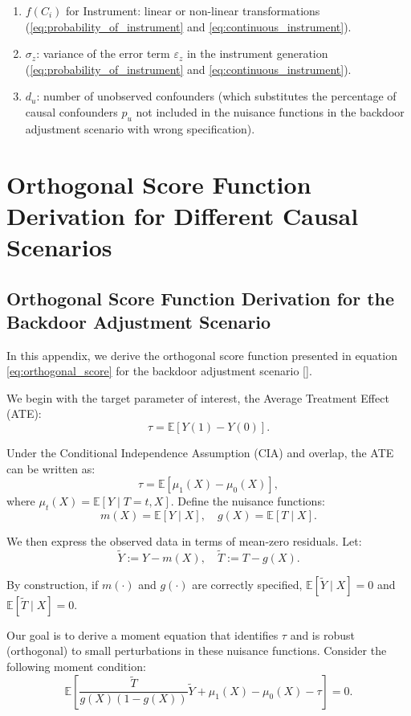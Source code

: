 \documentclass{article}
\numberwithin{equation}{section}
\begin{document}
\begin{enumerate}[label=\roman*.]
    \item $f(C_i)$ for Instrument: linear or non-linear transformations (\ref{eq:probability_of_instrument} and \ref{eq:continuous_instrument}).
    \item $\sigma_z$: variance of the error term $\varepsilon_z$ in the instrument generation (\ref{eq:probability_of_instrument} and \ref{eq:continuous_instrument}).
    \item $d_u$: number of unobserved confounders (which substitutes the percentage of causal confounders $p_u$ not included in the nuisance functions in the backdoor adjustment scenario with wrong specification).
\end{enumerate}

\section{Orthogonal Score Function Derivation for Different Causal Scenarios}

\subsection{Orthogonal Score Function Derivation for the Backdoor Adjustment Scenario}
\label{subsec:appendix_orthogonal_score_function_backdoor_adjustment}

In this appendix, we derive the orthogonal score function presented in equation \eqref{eq:orthogonal_score} for the backdoor adjustment scenario [\cite{ChernozhukovChetverikovDemireretal2018, Pearl2009}].

We begin with the target parameter of interest, the Average Treatment Effect (ATE):
\[
\tau = \mathbb{E}[Y(1) - Y(0)].
\]

Under the Conditional Independence Assumption (CIA) and overlap, the ATE can be written as:
\[
\tau = \mathbb{E}[\mu_1(X) - \mu_0(X)],
\]
where \(\mu_t(X) = \mathbb{E}[Y \mid T=t,X]\). Define the nuisance functions:
\[
m(X) = \mathbb{E}[Y \mid X], \quad g(X) = \mathbb{E}[T \mid X].
\]

We then express the observed data in terms of mean-zero residuals. Let:
\[
\tilde{Y} := Y - m(X), \quad \tilde{T} := T - g(X).
\]

By construction, if \(m(\cdot)\) and \(g(\cdot)\) are correctly specified, \(\mathbb{E}[\tilde{Y} \mid X] = 0\) and \(\mathbb{E}[\tilde{T} \mid X] = 0\).

Our goal is to derive a moment equation that identifies \(\tau\) and is robust (orthogonal) to small perturbations in these nuisance functions. Consider the following moment condition:
\[
\mathbb{E}\left[ \frac{\tilde{T}}{g(X)(1-g(X))}\tilde{Y} + \mu_1(X)-\mu_0(X) - \tau \right] = 0.
\]
\end{document}
